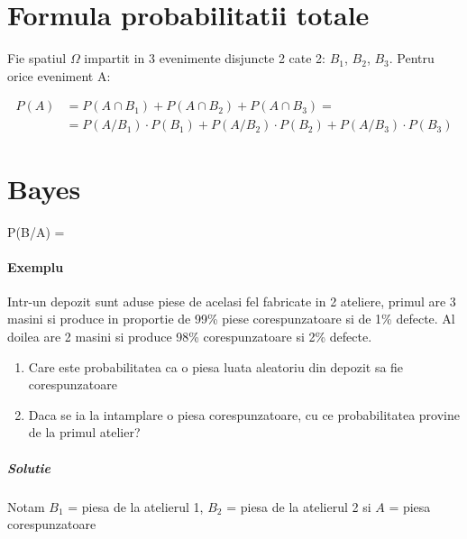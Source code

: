 \documentclass[oneside]{memoir}
\begin{document}
\section[Formula probabilitatii totale]{Formula probabilitatii totale}
Fie spatiul $\Omega$ impartit in 3 evenimente disjuncte 2 cate 2: $B_1$, $B_2$, $B_3$. Pentru orice eveniment A:
\begin{center}
    \begin{equation*}
        \begin{split}
P(A) &= P(A\cap B_1) +  P(A\cap B_2) +  P(A\cap B_3) = \\ 
&= P(A/B_1) \cdot  P(B_1) + P(A/B_2) \cdot  P(B_2) + P(A/B_3) \cdot  P(B_3)
        \end{split}
    \end{equation*}
\end{center}

\section[Bayes]{Bayes}
\begin{center}
    \begin{myequation*}
        P(B/A) = 
    \end{myequation*}
\end{center}

\paragraph*{Exemplu} Intr-un depozit sunt aduse piese de acelasi fel fabricate in 2 ateliere, primul are 3 masini si produce in proportie de 99\% piese corespunzatoare si de 1\% defecte. Al doilea are 2 masini si produce 98\% corespunzatoare si 2\% defecte.
\begin{enumerate}
    \item Care este probabilitatea ca o piesa luata aleatoriu din depozit sa fie corespunzatoare
    \item Daca se ia la intamplare o piesa corespunzatoare, cu ce probabilitatea provine de la primul atelier?
\end{enumerate}

\subparagraph*{Solutie} Notam $B_1$ = piesa de la atelierul 1, $B_2$ = piesa de la atelierul 2 si $A$ = piesa corespunzatoare
\end{document}
